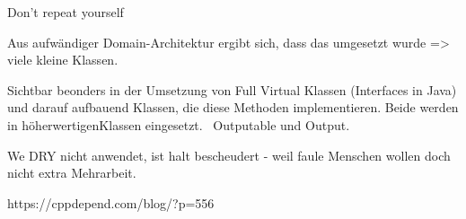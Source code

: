 
Don't repeat yourself

Aus aufwändiger Domain-Architektur ergibt sich, dass das umgesetzt wurde => viele kleine Klassen.



Sichtbar beonders in der Umsetzung von Full Virtual Klassen (Interfaces in Java) und darauf aufbauend Klassen, die diese Methoden implementieren.
Beide werden in \glq höherwertigen\grqq Klassen eingesetzt. \zB\ Outputable und Output.



We DRY nicht anwendet, ist halt bescheudert - weil faule Menschen wollen doch nicht extra Mehrarbeit.






https://cppdepend.com/blog/?p=556